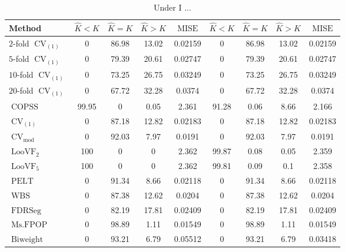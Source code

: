 \begin{table}[ht]
\centering
\begin{tabular}{|l|cccc|cccc|}
  \hline
Method & $\hat{K} < K$ & $\hat{K} = K$ & $\hat{K} > K$ & $\operatorname{MISE}$ & $\hat{K} < K$ & $\hat{K} = K$ & $\hat{K} > K$ & $\operatorname{MISE}$ \\ 
  \hline
$2$-fold $\operatorname{CV}_{(1)}$ &     0 & 86.98 & 13.02 & 0.02159 &     0 & 86.98 & 13.02 & 0.02159 \\ 
  $5$-fold $\operatorname{CV}_{(1)}$ &     0 & 79.39 & 20.61 & 0.02747 &     0 & 79.39 & 20.61 & 0.02747 \\ 
  $10$-fold $\operatorname{CV}_{(1)}$ &     0 & 73.25 & 26.75 & 0.03249 &     0 & 73.25 & 26.75 & 0.03249 \\ 
  $20$-fold $\operatorname{CV}_{(1)}$ &     0 & 67.72 & 32.28 & 0.0374 &     0 & 67.72 & 32.28 & 0.0374 \\ 
  $\operatorname{COPSS}$ & 99.95 &     0 &  0.05 & 2.361 & 91.28 &  0.06 &  8.66 & 2.166 \\ 
  $\operatorname{CV}_{(1)}$ &     0 & 87.18 & 12.82 & 0.02183 &     0 & 87.18 & 12.82 & 0.02183 \\ 
  $\operatorname{CV}_{\operatorname{mod}}$ &     0 & 92.03 &  7.97 & 0.0191 &     0 & 92.03 &  7.97 & 0.0191 \\ 
  $\operatorname{LooVF}_2$ &   100 &     0 &     0 & 2.362 & 99.87 &  0.08 &  0.05 & 2.359 \\ 
  $\operatorname{LooVF}_5$ &   100 &     0 &     0 & 2.362 & 99.81 &  0.09 &   0.1 & 2.358 \\ 
  $\operatorname{PELT}$ &     0 & 91.34 &  8.66 & 0.02118 &     0 & 91.34 &  8.66 & 0.02118 \\ 
  $\operatorname{WBS}$ &     0 & 87.38 & 12.62 & 0.0204 &     0 & 87.38 & 12.62 & 0.0204 \\ 
  $\operatorname{FDRSeg}$ &     0 & 82.19 & 17.81 & 0.02409 &     0 & 82.19 & 17.81 & 0.02409 \\ 
  $\operatorname{Ms.FPOP}$ &     0 & 98.89 &  1.11 & 0.01549 &     0 & 98.89 &  1.11 & 0.01549 \\ 
  $\operatorname{Biweight}$ &     0 & 93.21 &  6.79 & 0.05512 &     0 & 93.21 &  6.79 & 0.03418 \\ 
   \hline
\end{tabular}
\caption{Under I ...} 
\end{table}
